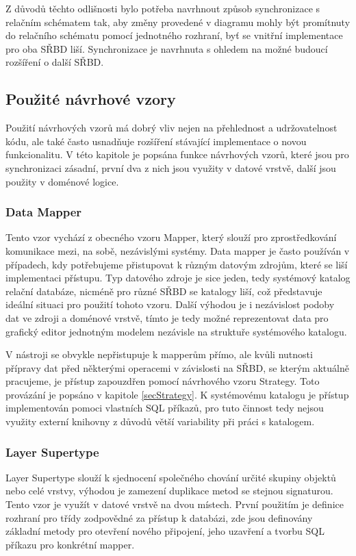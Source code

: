\documentclass[czech,bachelor,public,dept460,male,oneside]{diploma}
\begin{document}
Z důvodů těchto odlišnosti bylo potřeba navrhnout způsob synchronizace s relačním schématem tak, aby změny provedené v diagramu mohly být promítnuty do relačního schématu pomocí jednotného rozhraní, byť se vnitřní implementace pro oba SŘBD liší. Synchronizace je navrhnuta s ohledem na možné budoucí rozšíření o další SŘBD.
	
	\subsection{Použité návrhové vzory}
	Použití návrhových vzorů má dobrý vliv nejen na přehlednost a udržovatelnost kódu, ale také často usnadňuje rozšíření stávající implementace o novou funkcionalitu.  V této kapitole je popsána funkce návrhových vzorů, které jsou pro synchronizaci zásadní, první dva z nich jsou využity v datové vrstvě, další jsou použity v doménové logice.
	
		\subsubsection{Data Mapper}
		Tento vzor vychází z obecného vzoru Mapper, který slouží pro zprostředkování komunikace mezi, na sobě, nezávislými systémy. Data mapper je často používán v případech, kdy potřebujeme přistupovat k různým datovým zdrojům, které se liší implementaci přístupu. Typ datového zdroje je sice jeden, tedy systémový katalog relační databáze, nicméně pro různé SŘBD se katalogy liší, což představuje ideální situaci pro použití tohoto vzoru. Další výhodou je i nezávislost podoby dat ve zdroji a doménové vrstvě, tímto je tedy možné reprezentovat data pro grafický editor jednotným modelem nezávisle na struktuře systémového katalogu.
		
		V nástroji se obvykle nepřistupuje k mapperům přímo, ale kvůli nutnosti přípravy dat před některými operacemi v závislosti na SŘBD, se kterým aktuálně pracujeme, je přístup zapouzdřen pomocí návrhového vzoru Strategy. Toto provázání je popsáno v kapitole \ref{secStrategy}. K systémovému katalogu je přístup implementován pomoci vlastních SQL příkazů, pro tuto činnost tedy nejsou využity externí knihovny z důvodů větší variability při práci s katalogem.
		
		\subsubsection{Layer Supertype}
		Layer Supertype slouží k sjednocení společného chování určité skupiny objektů nebo celé vrstvy, výhodou je zamezení duplikace metod se stejnou signaturou. Tento vzor je využít v datové vrstvě na dvou místech. První použitím je definice rozhraní pro třídy zodpovědné za přístup k databázi, zde jsou definovány základní metody pro otevření nového připojení, jeho uzavření a tvorbu SQL příkazu pro konkrétní mapper. 
		
\end{document}
